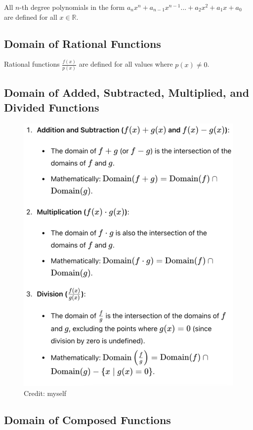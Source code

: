 \documentclass[12pt]{article}
\begin{document}
All \(n\)-th degree polynomials in the  form \(a_nx^n+a_{n-1}x^{n-1}...+a_2x^2+a_1x+a_0\) are defined for all \(x\in\mathbb{R}\).

\subsection{Domain of Rational Functions}

Rational functions \(\frac{f(x)}{p(x)}\) are defined for all values where \(p(x)\neq0\).

\subsection{Domain of Added, Subtracted, Multiplied, and Divided Functions}

\begin{figure}[H]
	\centering
	\includegraphics[scale=0.35]{add.png}
	\caption{Credit: myself}
\end{figure}

\subsection{Domain of Composed Functions}
\end{document}
